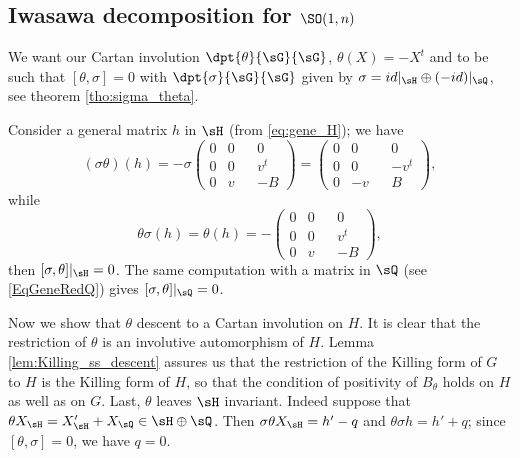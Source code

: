 \subsection{Iwasawa decomposition for \texorpdfstring{$\SO(1,n)$}{SO1n}}
\label{SubSecIwaSOunn}

We want our Cartan involution $\dpt{\theta}{\sG}{\sG}$, $\theta(X)=-X^t$ and to be such that $[\theta,\sigma]=0$ with $\dpt{\sigma}{\sG}{\sG}$ given by $\sigma=id|_{\sH}\oplus(-id)|_{\sQ}$, see theorem \ref{tho:sigma_theta}.\label{pg:calcul_sigma_theta}

Consider a general matrix $h$ in $\sH$ (from \eqref{eq:gene_H}); we have
\[
  (\sigma\theta)(h)=-\sigma
  \begin{pmatrix}
  0&0&&0\\
  0&0&&v^t\\
  0&v&&-B
  \end{pmatrix}=
  \begin{pmatrix}
  0&0&&0\\
  0&0&&-v^t\\
  0&-v&&B
  \end{pmatrix},
\]
while
\[
  \theta\sigma(h)=\theta(h)=-
  \begin{pmatrix}
  0&0&&0\\
  0&0&&v^t\\
  0&v&&-B
  \end{pmatrix},
\] 
then $[\sigma,\theta]|_{\sH}=0$. The same computation with a matrix in $\sQ$ (see \eqref{EqGeneRedQ}) gives $[\sigma,\theta]|_{\sQ}=0$.

Now we show that $\theta$ descent to a Cartan involution on $H$. It is clear that the restriction of $\theta$ is an involutive automorphism of $H$. Lemma \ref{lem:Killing_ss_descent} assures us that the restriction of the Killing form of $G$ to $H$ is the Killing form of $H$, so that the condition of positivity of $B_{\theta}$ holds on $H$ as well as on $G$. Last, $\theta$ leaves $\sH$ invariant. Indeed suppose that  $\theta X_{\sH}=X'_{\sH}+X_{\sQ}\in\sH\oplus\sQ$. Then $\sigma\theta X_{\sH}=h'-q$ and $\theta\sigma h=h'+q$; since $[\theta,\sigma]=0$, we have $q=0$.

